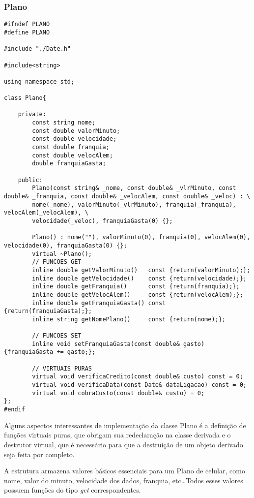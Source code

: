 \subsubsection{Plano} \label{sec:plano}

\begin{lstlisting}[basicstyle=\tiny]
#ifndef PLANO
#define PLANO

#include "./Date.h"

#include<string>

using namespace std;

class Plano{

	private:
		const string nome;
		const double valorMinuto;
		const double velocidade;
		const double franquia;
		const double velocAlem;
		double franquiaGasta;
		
	public:
		Plano(const string& _nome, const double& _vlrMinuto, const double& _franquia, const double& _velocAlem, const double& _veloc) : \
		nome(_nome), valorMinuto(_vlrMinuto), franquia(_franquia), velocAlem(_velocAlem), \
		velocidade(_veloc), franquiaGasta(0) {};
		
		Plano() : nome(""), valorMinuto(0), franquia(0), velocAlem(0), velocidade(0), franquiaGasta(0) {};
		virtual ~Plano();
		// FUNCOES GET
		inline double getValorMinuto()   const {return(valorMinuto);};
		inline double getVelocidade()    const {return(velocidade);};
		inline double getFranquia()      const {return(franquia);};
		inline double getVelocAlem()     const {return(velocAlem);};
		inline double getFranquiaGasta() const {return(franquiaGasta);};
		inline string getNomePlano()     const {return(nome);};
		
		// FUNCOES SET
		inline void setFranquiaGasta(const double& gasto) {franquiaGasta += gasto;};
		
		// VIRTUAIS PURAS
		virtual void verificaCredito(const double& custo) const = 0;
		virtual void verificaData(const Date& dataLigacao) const = 0;
		virtual void cobraCusto(const double& custo) = 0;
};
#endif
\end{lstlisting}

Alguns aspectos interessantes de implementação da classe Plano é a definição de funções virtuais puras, que obrigam sua redeclaração na classe derivada e o destrutor virtual, que é necessário para que a destruição de um objeto derivado seja feita por completo.

A estrutura armazena valores básicos essenciais para um Plano de celular, como nome, valor do minuto, velocidade dos dados, franquia, etc\dots Todos esses valores possuem funções do tipo \textit{get} correspondentes.

